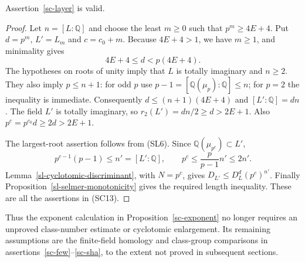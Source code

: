 \begin{theorem}\label{sl-enlargement}
Assertion~\ref{sc-layer} is valid.
\end{theorem}
\begin{proof}
Let $n=[L:\mathbb Q]$ and choose the least $m\ge0$ such that
$p^m\ge4E+4$.  Put $d=p^m$, $L'=L_m$ and $c=c_0+m$.
Because $4E+4>1$, we have $m\ge1$, and minimality gives
\[
                    4E+4\le d<p(4E+4).
                    \tag{SL9}
\]
The hypotheses on roots of unity imply that $L$ is totally
imaginary and $n\ge2$.  They also imply $p\le n+1$:
for odd $p$ use $p-1=[\mathbb Q(\mu_p):\mathbb Q]\le n$;
for $p=2$ the inequality is immediate.
Consequently $d\le(n+1)(4E+4)$ and
$[L':\mathbb Q]=dn$.
The field $L'$ is totally imaginary, so
$r_2(L')=dn/2\ge d>2E+1$.
Also $p^c=p^{c_0}d\ge2d>2E+1$.

The largest-root assertion follows from (SL6).
Since $\mathbb Q(\mu_{p^c})\subset L'$,
\[
        p^{c-1}(p-1)\le n'=[L':\mathbb Q],
        \qquad p^c\le\frac{p}{p-1}n'\le2n'.
\]
Lemma~\ref{sl-cyclotomic-discriminant}, with $N=p^c$,
gives $D_{L'}\le D_L^d(p^c)^{n'}$.
Finally Proposition~\ref{sl-selmer-monotonicity} gives the
required length inequality.  These are all the assertions
in (SC13).
\end{proof}

Thus the exponent calculation in Proposition~\ref{sc-exponent}
no longer requires an unproved class-number estimate or
cyclotomic enlargement.  Its remaining assumptions are the
finite-field homology and class-group comparisons in
assertions~\ref{sc-few}--\ref{sc-sha}, to the extent not proved
in subsequent sections.


